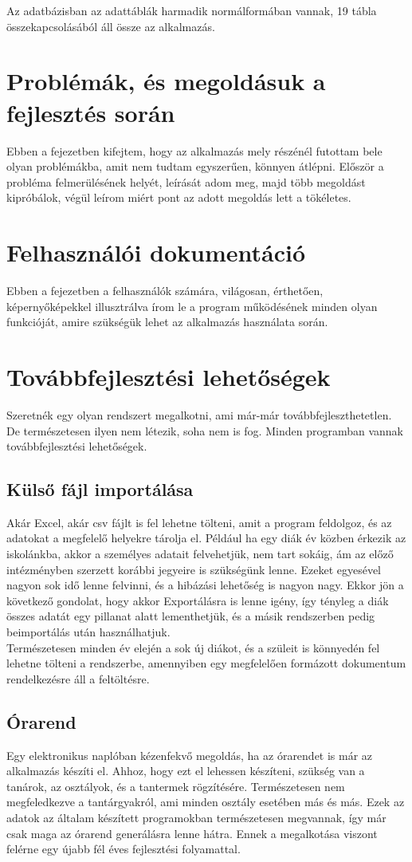 \documentclass[
]{thesis-ekf}
\begin{document}
 Az adatbázisban az adattáblák harmadik normálformában vannak, 19 tábla összekapcsolásából áll össze az alkalmazás.
\chapter{Problémák, és megoldásuk a fejlesztés során}
Ebben a fejezetben kifejtem, hogy az alkalmazás mely részénél futottam bele olyan problémákba, amit nem tudtam egyszerűen, könnyen átlépni. Először a probléma felmerülésének helyét, leírását adom meg, majd több megoldást kipróbálok, végül leírom miért pont az adott megoldás lett a tökéletes.
\chapter{Felhasználói dokumentáció}
Ebben a fejezetben a felhasználók számára, világosan, érthetően, képernyőképekkel illusztrálva írom le a program működésének minden olyan funkcióját, amire szükségük lehet az alkalmazás használata során.
\chapter{Továbbfejlesztési lehetőségek}
Szeretnék egy olyan rendszert megalkotni, ami már-már továbbfejleszthetetlen. De természetesen ilyen nem létezik, soha nem is fog. Minden programban vannak továbbfejlesztési lehetőségek.
\section{Külső fájl importálása}
Akár Excel, akár csv fájlt is fel lehetne tölteni, amit a program feldolgoz, és az adatokat a megfelelő helyekre tárolja el. Például ha egy diák év közben érkezik az iskolánkba, akkor a személyes adatait felvehetjük, nem tart sokáig, ám az előző intézményben szerzett korábbi jegyeire is szükségünk lenne. Ezeket egyesével nagyon sok idő lenne felvinni, és a hibázási lehetőség is nagyon nagy. Ekkor jön a következő gondolat, hogy akkor Exportálásra is lenne igény, így tényleg a diák összes adatát egy pillanat alatt lementhetjük, és a másik rendszerben pedig beimportálás után használhatjuk.\\
Természetesen minden év elején a sok új diákot, és a szüleit is könnyedén fel lehetne tölteni a rendszerbe, amennyiben egy megfelelően formázott dokumentum rendelkezésre áll a feltöltésre.
\section{Órarend}
Egy elektronikus naplóban kézenfekvő megoldás, ha az órarendet is már az alkalmazás készíti el. Ahhoz, hogy ezt el lehessen készíteni, szükség van a tanárok, az osztályok, és a tantermek rögzítésére. Természetesen nem megfeledkezve a tantárgyakról, ami minden osztály esetében más és más. Ezek az adatok az általam készített programokban természetesen megvannak, így már csak maga az órarend generálásra lenne hátra. Ennek a megalkotása viszont felérne egy újabb fél éves fejlesztési folyamattal.
\end{document}
